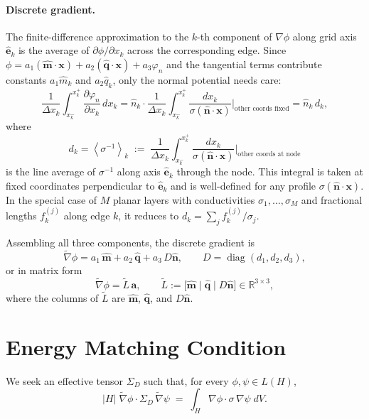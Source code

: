 \documentclass[11pt]{article}
\newcommand{\nn}{\hat{\bm{n}}}
\newcommand{\mm}{\hat{\bm{m}}}
\newcommand{\qq}{\hat{\bm{q}}}
\newcommand{\ee}[1]{\hat{\bm{e}}_{#1}}
\newcommand{\tL}{\widetilde{L}}
\newcommand{\SD}{\Sigma_D}
\newcommand{\tvnabla}{\widetilde{\nabla}}
\begin{document}
\paragraph{Discrete gradient.}
The finite-difference approximation to the $k$-th component of $\nabla\phi$
along grid axis $\ee{k}$ is the average of $\partial\phi/\partial x_k$ across
the corresponding edge.  Since $\phi = a_1(\mm\cdot\bm{x}) + a_2(\qq\cdot\bm{x})
+ a_3\varphi_n$ and the tangential terms contribute constants $a_1 \hat{m}_k$
and $a_2 \hat{q}_k$, only the normal potential needs care:
\[
    \frac{1}{\Delta x_k}\int_{x_k^-}^{x_k^+}
    \frac{\partial\varphi_n}{\partial x_k}\,dx_k
    = \hat{n}_k \cdot \frac{1}{\Delta x_k}\int_{x_k^-}^{x_k^+}
    \frac{dx_k}{\sigma(\nn\cdot\bm{x})}\Bigr|_{\text{other coords fixed}}
    = \hat{n}_k\, d_k,
\]
where
\begin{equation}\label{eq:dk}
    d_k = \left\langle\sigma^{-1}\right\rangle_k
    \;:=\;
    \frac{1}{\Delta x_k}\int_{x_k^-}^{x_k^+}
    \frac{dx_k}{\sigma(\nn\cdot\bm{x})}\Bigr|_{\text{other coords at node}}
\end{equation}
is the line average of $\sigma^{-1}$ along axis $\ee{k}$ through the node.
This integral is taken at fixed coordinates perpendicular to $\ee{k}$ and
is well-defined for any profile $\sigma(\nn\cdot\bm{x})$.  In the special
case of $M$ planar layers with conductivities $\sigma_1,\ldots,\sigma_M$ and
fractional lengths $f_k^{(j)}$ along edge $k$, it reduces to
$d_k = \sum_j f_k^{(j)}/\sigma_j$.

Assembling all three components, the discrete gradient is
\begin{equation}\label{eq:disc_grad}
    \tvnabla\phi = a_1\,\mm + a_2\,\qq + a_3\,D\nn,
    \qquad D = \operatorname{diag}(d_1,d_2,d_3),
\end{equation}
or in matrix form
\[
    \tvnabla\phi = \tL\,\bm{a},
    \qquad \tL := \bigl[\mm\;\big|\;\qq\;\big|\;D\nn\bigr] \in \mathbb{R}^{3\times 3},
\]
where the columns of $\tL$ are $\mm$, $\qq$, and $D\nn$.

\section{Energy Matching Condition}\label{sec:energy_matching}

We seek an effective tensor $\SD$ such that, for every $\phi,\psi\in L(H)$,
\begin{equation}\label{eq:energy_match}
    |H|\;\tvnabla\phi\cdot\SD\,\tvnabla\psi
    \;=\;
    \int_H \nabla\phi\cdot\sigma\,\nabla\psi\;dV.
\end{equation}
\end{document}
